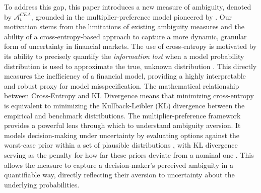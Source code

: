\documentclass[preprint,12pt,authoryear]{elsarticle}
\begin{document}

To address this gap, this paper introduces a new measure of ambiguity, denoted by $\mathcal{A}^{CEA}_t$, grounded in the multiplier-preference model pioneered by \cite{hansen2001}. Our motivation stems from the limitations of existing ambiguity measures and the ability of a cross-entropy-based approach to capture a more dynamic, granular form of uncertainty in financial markets. The use of cross-entropy is motivated by its ability to precisely quantify the \textit{information lost} when a model probability distribution is used to approximate the true, unknown distribution \cite{klibanoff2005}. This directly measures the inefficiency of a financial model, providing a highly interpretable and robust proxy for model misspecification. The mathematical relationship between Cross-Entropy and KL Divergence \cite{mackay2003information} means that minimizing cross-entropy is equivalent to minimizing the Kullback-Leibler (KL) divergence between the empirical and benchmark distributions. The multiplier-preference framework \cite{epstein2008} provides a powerful lens through which to understand ambiguity aversion. It models decision-making under uncertainty by evaluating options against the worst-case prior within a set of plausible distributions \cite{maccheroni2006}, with KL divergence serving as the penalty for how far these priors deviate from a nominal one \cite{epstein2008}. This allows the measure to capture a decision-maker's perceived ambiguity in a quantifiable way, directly reflecting their aversion to uncertainty about the underlying probabilities.
\end{document}
